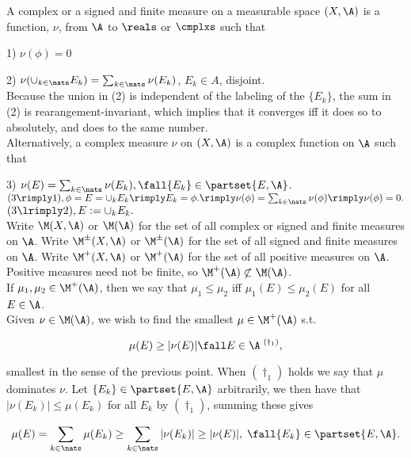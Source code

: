 A complex or a signed and finite measure on a measurable space $(X,\A)$ is a function, $\nu$, from $\A$ to $\reals$ or $\cmplxs$ such that

1) $\nu(\phi) = 0$

2) $\nu( \cup_{k\in \nats} E_k ) = \sum_{k \in \nats} \nu(E_k) $, $E_k \in A$, disjoint.  \\

Because the union in (2) is independent of the labeling of the $\{ E_k \}$, the sum in (2) is rearangement-invariant, which implies that it converges iff it does so to absolutely, and does to the same number. \\

Alternatively, a complex measure $\nu$ on $(X,\A)$ is a complex function on $\A$ such that

3) $\nu(E) = \sum_{k \in \nats} \nu(E_k), \fall \{ E_k\} \in \partset{E, \A}$.\\

$(3 \rimply 1), \phi = E = \cup_k E_k \rimply E_k = \phi. \rimply \nu(\phi) = \sum_{k \in \nats } \nu(\phi) \rimply \nu(\phi) = 0.$ $(3 \lrimply 2), E := \cup_k E_k.$ \\



Write $\M(X,\A)$ or $\M(\A)$ for the set of all complex or signed and finite measures on $\A$.
Write $\M^\pm(X,\A)$ or $\M^\pm(\A)$ for the set of all signed and finite measures on $\A$.
Write $\M^+(X,\A)$ or $\M^+(\A)$ for the set of all positive measures on $\A$. 
Positive measures need not be finite, so $\M^+(\A) \not \subset \M(\A)$.
\\



If $\mu_1,\mu_2 \in \M^+(\A)$, then we say that $\mu_1 \le \mu_2$ iff $\mu_1(E) \le \mu_2(E)$ for all $E \in \A$.\\

Given $\nu \in \M(\A)$, we wish to find the smallest $\mu \in \M^+(\A)$ s.t.

$$
     \mu(E)  \ge |\nu(E)| \fall E \in \A  \; {}^{(\dagger_1)},
$$
 
\noindent
smallest in the sense of the previous point. When ${(\dagger_1)}$ holds we say that $\mu$ dominates $\nu$.  Let $\{ E_k \} \in \partset{E,\A}$ arbitrarily, we then have that $|\nu(E_k)| \le \mu(E_k)$ for all $E_k$ by ${(\dagger_1)}$, summing these gives 

$$
\mu(E) = \sum_{k \in \nats} \mu(E_k) \ge \sum_{k \in \nats} |\nu(E_k)| \ge | \nu(E)|, \; \fall \{ E_k\} \in \partset{E, \A}.
$$

